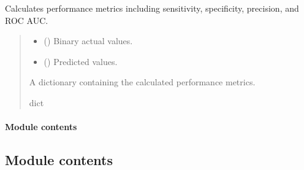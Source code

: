 \documentclass[letterpaper,10pt,english]{sphinxmanual}
\begin{document}
\begin{fulllineitems}
\label{\detokenize{domain.services:domain.services.metrics.performance_metrics}}
\pysigstartsignatures
{}
\pysigstopsignatures
\sphinxAtStartPar
Calculates performance metrics including sensitivity, specificity, precision, and ROC AUC.
\begin{quote}\begin{description}
\begin{itemize}
\item {} 
\sphinxAtStartPar
{} () \textendash{} Binary actual values.

\item {} 
\sphinxAtStartPar
{} () \textendash{} Predicted values.

\end{itemize}

\sphinxAtStartPar
A dictionary containing the calculated performance metrics.

\sphinxAtStartPar
dict

\end{description}\end{quote}

\end{fulllineitems}



\paragraph{Module contents}
\label{\detokenize{domain.services:module-domain.services}}\label{\detokenize{domain.services:module-contents}}

\subsection{Module contents}
\label{\detokenize{domain:module-domain}}\label{\detokenize{domain:module-contents}}
\sphinxstepscope
\end{document}
